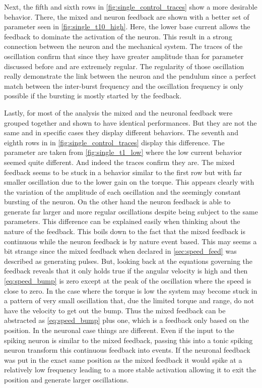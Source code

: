 Next, the fifth and sixth rows in \cref{fig:single_control_traces} show a more desirable behavior. 
There, the mixed and neuron feedback are shown with a better set of parameter seen in \cref{fig:single_t10_high}. 
Here, the lower base current allows the feedback to dominate the activation of the neuron. 
This result in a strong connection between the neuron and the mechanical system. 
The traces of the oscillation confirm that since they have greater amplitude than for parameter discussed before and are extremely regular. 
The regularity of those oscillation really demonstrate the link between the neuron and the pendulum since a perfect match between the inter-burst frequency and the oscillation frequency is only possible if the bursting is mostly started by the feedback.

Lastly, for most of the analysis the mixed and the neuronal feedback were grouped together and shown to have identical performances. 
But they are not the same and in specific cases they display different behaviors. 
The seventh and eighth rows in in \cref{fig:single_control_traces} display this difference. 
The parameter are taken from \cref{fig:single_t1_low} where the low current behavior seemed quite different. 
And indeed the traces confirm they are. 
The mixed feedback seems to be stuck in a behavior similar to the first row but with far smaller oscillation due to the lower gain on the torque. 
This appears clearly with the variation of the amplitude of each oscillation and the seemingly constant bursting of the neuron. 
On the other hand the neuron feedback is able to generate far larger and more regular oscillations despite being subject to the same parameters. 
This difference can be explained easily when thinking about the nature of the feedback. 
This boils down to the fact that the mixed feedback is continuous while the neuron feedback is by nature event based. 
This may seems a  bit strange since the mixed feedback when declared in \cref{sec:speed_feed} was described as generating pulses. 
But, looking back at the equations governing the feedback reveals that it only holds true if the angular velocity is high and then \cref{eq:speed_bump} is zero except at the peak of the oscillation where the speed is close to zero. 
In the case where the torque is low the system may become stuck in a pattern of very small oscillation that, due the limited torque and range, do not have the velocity to get out the bump. 
Thus the mixed feedback can be abstracted as \cref{eq:speed_bump} plus one, which is a feedback only based on the position.\label{par:mixed_problem}
In the neuronal case things are different.
Even if the input to the spiking neuron is similar to the mixed feedback, passing this into a tonic spiking neuron transform this continuous feedback into events. 
If the neuronal feedback was put in the exact same position as the mixed feedback it would spike at a relatively low frequency leading to a more stable activation allowing it to exit the position and generate larger oscillations.


